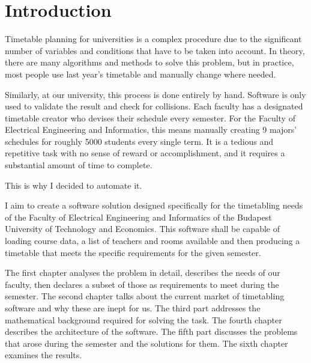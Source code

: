 \chapter*{Introduction}

Timetable planning for universities is a complex procedure due to the significant number of variables and conditions that have to be taken into account. In theory, there are many algorithms and methods to solve this problem, but in practice, most people use last year's timetable and manually change where needed.

Similarly, at our university, this process is done entirely by hand. Software is only used to validate the result and check for collisions. Each faculty has a designated timetable creator who devises their schedule every semester. For the Faculty of Electrical Engineering and Informatics, this means manually creating 9 majors' schedules for roughly 5000 students every single term. It is a tedious and repetitive task with no sense of reward or accomplishment, and it requires a substantial amount of time to complete.

This is why I decided to automate it.

I aim to create a software solution designed specifically for the timetabling needs of the Faculty of Electrical Engineering and Informatics of the Budapest University of Technology and Economics. This software shall be capable of loading course data, 
a list of teachers and rooms available and then producing a timetable that meets the specific requirements for the given semester.

The first chapter analyses the problem in detail, describes the needs of our faculty, then declares a subset of those as requirements to meet during the semester. The second chapter talks about the current market of timetabling software and why these are inept for us. The third part addresses the mathematical background required for solving the task. The fourth chapter describes the architecture of the software. The fifth part discusses the problems that arose during the semester and the solutions for them. The sixth chapter examines the results.
